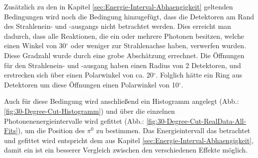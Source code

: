 \documentclass[a4paper,11pt,oneside,final,german,openbib,pdftex]{scrbook}
\begin{document}
{%



Zus\"atzlich zu den in Kapitel \ref{sec:Energie-Interval-Abhaengigkeit} geltenden Bedingungen wird noch die Bedingung hinzugef\"ugt, dass die Detektoren am Rand des Strahlenein- und -ausgangs nicht betrachtet werden. Dies erreicht man dadurch, dass alle Reaktionen, die ein oder mehrere Photonen besitzen, welche einen Winkel von 30$^{\circ}$ oder weniger zur Strahlenachse haben, verwerfen wurden. Diese Gradzahl wurde durch eine grobe Absch\"atzung errechnet. Die \"Offnungen f\"ur den Strahlenein- und -ausgang haben einen Radius von 2 Detektoren, und erstrecken sich \"uber einen Polarwinkel von ca. 20$^{\circ}$. Folglich h\"atte ein Ring aus Detektoren um diese \"Offnungen einen Polarwinkel von 10$^{\circ}$. 
 
Auch f\"ur diese Bedingung wird anschlie{\ss}end ein Histogramm angelegt (Abb.: \ref{fig:30-Degree-Cut-Histogramm}) und über die einzelnen Photonenenergieintervalle wird gefittet (Abb.: \ref{fig:30-Degree-Cut-RealData-All-Fits}), um die Position des $\pi^0$ zu bestimmen. Das Energieintervall das betrachtet und gefittet wird entspricht dem aus Kapitel \ref{sec:Energie-Interval-Abhaengigkeit}, damit ein ist ein besserer Vergleich zwischen den verschiedenen Effekte m\"oglich.

}
\end{document}
